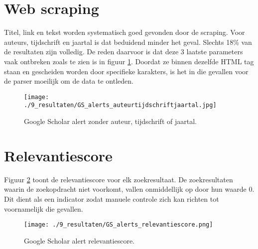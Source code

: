 \section{Web scraping}
Titel, link en tekst worden systematisch goed gevonden door de scraping. Voor auteurs, tijdschrift en jaartal is dat beduidend minder het geval. Slechts 18\% van de resultaten zijn volledig. De reden daarvoor is dat deze 3 laatste parameters vaak ontbreken zoals te zien is in figuur \ref{fig:GSauteurtijdschriftjaartal}. Doordat ze binnen dezelfde HTML tag staan en gescheiden worden door specifieke karakters, is het in die gevallen voor de parser moeilijk om de data te ontleden.
\begin{figure}[h!]
    \centering
    \texttt{[image: ./9\_resultaten/GS\_alerts\_auteurtijdschriftjaartal.jpg]}
    \caption[Google Scholar alerts zonder auteur, tijdschrift of jaartal.]{\label{fig:GSauteurtijdschriftjaartal}Google Scholar alert zonder auteur, tijdschrift of jaartal.}
\end{figure}

\section{Relevantiescore}
Figuur \ref{fig:GSrelevantie} toont de relevantiescore voor elk zoekresultaat. De zoekresultaten waarin de zoekopdracht niet voorkomt, vallen onmiddellijk op door hun waarde 0. Dit dient als een indicator zodat manuele controle zich kan richten tot voornamelijk die gevallen.
\begin{figure}[h!]
    \centering
    \texttt{[image: ./9\_resultaten/GS\_alerts\_relevantiescore.png]}
    \caption[Google Scholar alerts relevantiescore.]{\label{fig:GSrelevantie}Google Scholar alert relevantiescore.}
\end{figure}

